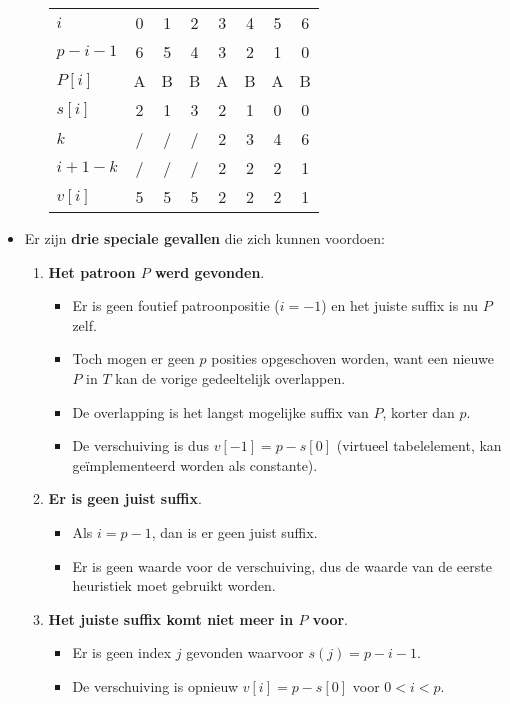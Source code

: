 \begin{itemize}
\begin{itemize}
        \begin{table}[ht]
            \centering
            \begin{tabular}{l | c c c c c c c}
                $i$         & 0 & 1 & 2 & 3 & 4 & 5 & 6 \\
                $p - i - 1$ & 6 & 5 & 4 & 3 & 2 & 1 & 0 \\
                \hline
                $P[i]$      & A & B & B & A & B & A & B \\
                \hline
                $s[i]$      & 2 & 1 & 3 & 2 & 1 & 0 & 0 \\
                $k$         & / & / & / & 2 & 3 & 4 & 6 \\
                $i + 1 - k$ & / & / & / & 2 & 2 & 2 & 1 \\
                $v[i]$      & 5 & 5 & 5 & 2 & 2 & 2 & 1
            \end{tabular}
            \caption{}
            \label{table:bm3}
        \end{table}
    \end{itemize}
    \item Er zijn \textbf{drie speciale gevallen} die zich kunnen voordoen:
    \begin{enumerate}
        \item \textbf{Het patroon $P$ werd gevonden}.
        \begin{itemize}
            \item Er is geen foutief patroonpositie ($i = -1$) en het juiste suffix is nu $P$ zelf.
            \item Toch mogen er geen  $p$ posities opgeschoven worden, want een nieuwe $P$ in $T$ kan de vorige gedeeltelijk overlappen.
            \item De overlapping is het langst mogelijke suffix van $P$, korter dan $p$.
            \item De verschuiving is dus $v[-1] = p - s[0]$ (virtueel tabelelement, kan geïmplementeerd worden als constante).
        \end{itemize}
        \item \textbf{Er is geen juist suffix}.
        \begin{itemize}
            \item Als $i = p - 1$, dan is er geen juist suffix.
            \item Er is geen waarde voor de verschuiving, dus de waarde van de eerste heuristiek moet gebruikt worden.
        \end{itemize}
        \item \textbf{Het juiste suffix komt niet meer in $P$ voor}.
        \begin{itemize}
            \item Er is geen index $j$ gevonden waarvoor $s(j) = p - i - 1$.
            \item De verschuiving is opnieuw $v[i] = p - s[0]$ voor $0 < i < p$.
        \end{itemize}
    \end{enumerate}
\end{itemize}

